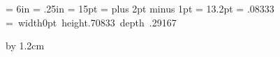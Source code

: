 \begin{\parsearg\beginxxx}
{{}%

%
\def\lineskipfactor{.08333}
\def\strutheightpercent{.70833}
\def\strutdepthpercent {.29167}
%
\def\setleading#1{%
  \normalbaselineskip = #1\relax
  \normallineskip = \lineskipfactor\normalbaselineskip
  \normalbaselines
  \setbox\strutbox =\hbox{%
    \vrule width0pt height\strutheightpercent\baselineskip
                    depth \strutdepthpercent \baselineskip
  }%
}

%
\def\|{%
  \leavevmode
  \vadjust{%
    \vskip-\baselineskip
    \llap{%
      \vrule height\baselineskip width1pt
      \hskip 12pt
    }%
  }%
}

%
\def\finalout{\overfullrule=0pt}




\def\openindices{%
   \newindex{cp}%
   \newcodeindex{fn}%
   \newcodeindex{vr}%
   \newcodeindex{tp}%
   \newcodeindex{ky}%
   \newcodeindex{pg}%
}


\hsize = 6in
\hoffset = .25in
\newdimen{} {} = 15pt
\parindent = 
\parskip 3pt plus 2pt minus 1pt
\setleading{13.2pt}
\advance\topskip by 1.2cm

}
\end{\parsearg\beginxxx}
